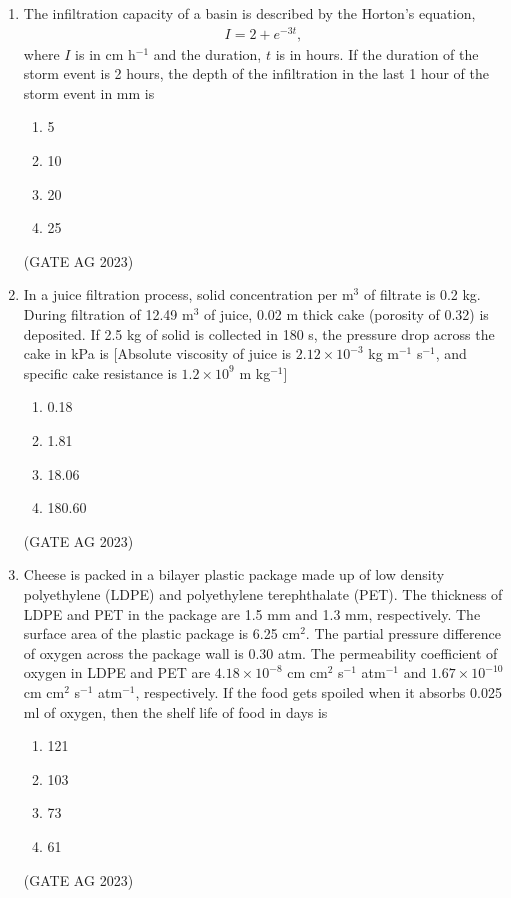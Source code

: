 \documentclass[journal,12pt,onecolumn]{IEEEtran}
\theoremstyle{remark}
\begin{document}
\begin{enumerate}
    \item The infiltration capacity of a basin is described by the Horton's equation,
    \begin{align*}
    I = 2 + e^{-3t},
    \end{align*}
    where $I$ is in cm h$^{-1}$ and the duration, $t$ is in hours. If the duration of the storm event is 2 hours, the depth of the infiltration in the last 1 hour of the storm event in mm is
    \begin{multicols}{4}
    \begin{enumerate}
        \item 5
        \item 10
        \item 20
        \item 25
    \end{enumerate}
    \end{multicols}
\hfill{(GATE AG 2023)}

    \item In a juice filtration process, solid concentration per m$^{3}$ of filtrate is 0.2 kg. During filtration of 12.49 m$^{3}$ of juice, 0.02 m thick cake (porosity of 0.32) is deposited. If 2.5 kg of solid is collected in 180 s, the pressure drop across the cake in kPa is
    [Absolute viscosity of juice is $2.12 \times 10^{-3}$ kg m$^{-1}$ s$^{-1}$, and specific cake resistance is $1.2 \times 10^{9}$ m kg$^{-1}$]
    \begin{multicols}{4}
    \begin{enumerate}
        \item 0.18
        \item 1.81
        \item 18.06
        \item 180.60
    \end{enumerate}
    \end{multicols}
\hfill{(GATE AG 2023)}

    \item Cheese is packed in a bilayer plastic package made up of low density polyethylene (LDPE) and polyethylene terephthalate (PET). The thickness of LDPE and PET in the package are 1.5 mm and 1.3 mm, respectively. The surface area of the plastic package is 6.25 cm$^{2}$. The partial pressure difference of oxygen across the package wall is 0.30 atm. The permeability coefficient of oxygen in LDPE and PET are $4.18 \times 10^{-8}$ cm cm$^{2}$ s$^{-1}$ atm$^{-1}$ and $1.67 \times 10^{-10}$ cm cm$^{2}$ s$^{-1}$ atm$^{-1}$, respectively. If the food gets spoiled when it absorbs 0.025 ml of oxygen, then the shelf life of food in days is
    \begin{multicols}{4}
    \begin{enumerate}
        \item 121
        \item 103
        \item 73
        \item 61
    \end{enumerate}
    \end{multicols}
\hfill{(GATE AG 2023)}


\end{enumerate}
\end{document}

